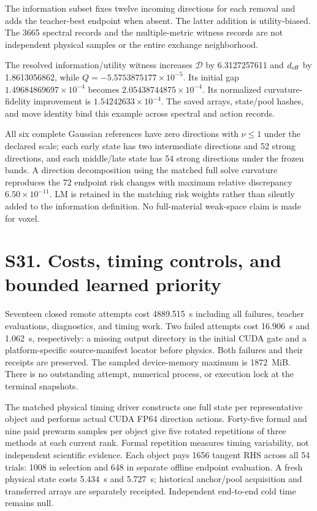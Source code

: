 The information subset fixes twelve incoming directions for each removal and adds the teacher-best endpoint when absent. The latter addition is utility-biased. The 3665 spectral records and the multiple-metric witness records are not independent physical samples or the entire exchange neighborhood.

The resolved information/utility witness increases $\mathcal D$ by 6.3127257611 and $d_{\rm eff}$ by 1.8613056862, while $Q=-5.5753875177\times10^{-5}$. Its initial gap $1.49684869697\times10^{-4}$ becomes $2.05438744875\times10^{-4}$. Its normalized curvature-fidelity improvement is $1.54242633\times10^{-4}$. The saved arrays, state/pool hashes, and move identity bind this example across spectral and action records.

All six complete Gaussian references have zero directions with $\nu\le1$ under the declared scale; each early state has two intermediate directions and 52 strong directions, and each middle/late state has 54 strong directions under the frozen bands. A direction decomposition using the matched full solve curvature reproduces the 72 endpoint risk changes with maximum relative discrepancy $6.50\times10^{-11}$. LM is retained in the matching risk weights rather than silently added to the information definition. No full-material weak-space claim is made for voxel.

\section*{S31. Costs, timing controls, and bounded learned priority}
Seventeen closed remote attempts cost 4889.515~s including all failures, teacher evaluations, diagnostics, and timing work. Two failed attempts cost 16.906~s and 1.062~s, respectively: a missing output directory in the initial CUDA gate and a platform-specific source-manifest locator before physics. Both failures and their receipts are preserved. The sampled device-memory maximum is 1872~MiB. There is no outstanding attempt, numerical process, or execution lock at the terminal snapshots.

The matched physical timing driver constructs one full state per representative object and performs actual CUDA FP64 direction actions. Forty-five formal and nine paid prewarm samples per object give five rotated repetitions of three methods at each current rank. Formal repetition measures timing variability, not independent scientific evidence. Each object pays 1656 tangent RHS across all 54 trials: 1008 in selection and 648 in separate offline endpoint evaluation. A fresh physical state costs 5.434~s and 5.727~s; historical anchor/pool acquisition and transferred arrays are separately receipted. Independent end-to-end cold time remains null.

